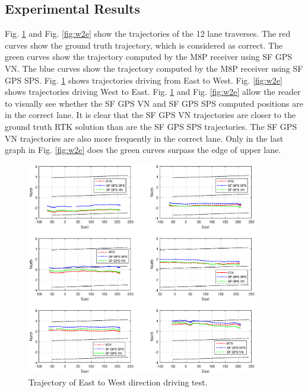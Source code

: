 \documentclass[letterpaper, 10 pt,onecolumn]{article}
\begin{document}
	\subsection{Experimental Results}
	Fig. \ref{fig:e2w} and Fig. \ref{fig:w2e} show the trajectories of the 12 lane traverses. The red curves show the ground truth trajectory, which is considered as correct. The green curves show the trajectory computed 
	by the M8P receiver using SF GPS VN. The blue curves show the trajectory computed by the M8P receiver using SF GPS SPS. 
	Fig. \ref{fig:e2w} shows trajectories driving from East to West. Fig. \ref{fig:w2e} shows trajectories driving West to East.
	Fig. \ref{fig:e2w} and Fig. \ref{fig:w2e} allow the reader to visually see whether the SF GPS VN and SF GPS SPS computed positions are in the correct lane. It is clear that the SF GPS VN trajectories are closer to the ground truth RTK solution than are the SF GPS SPS
	trajectories. The SF GPS VN trajectories are also more frequently in the correct lane. Only in the last graph in Fig. \ref{fig:w2e} does the green curves surpass the edge of upper lane.
	\begin{figure}[H]		
		\centering		
		\includegraphics[width=0.9\textwidth]{figures/e2w.eps}		
		\caption{Trajectory of East to West direction driving test.}		
		\label{fig:e2w}	
	\end{figure}
\end{document}
